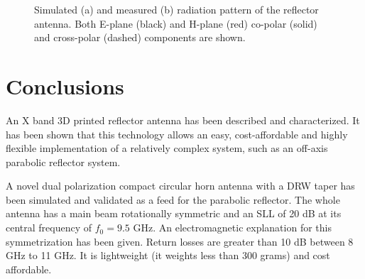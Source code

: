 \documentclass{IEEEtran}
\begin{document}
\begin{figure}[h]
	\centering
	\mbox{}
	\mbox{}
	\caption{Simulated (a) and measured (b) radiation pattern of the reflector antenna. Both E-plane (black) and H-plane (red) co-polar (solid) and cross-polar (dashed) components are shown.}
	\label{fig:DR}
\end{figure}

\section{Conclusions}

An X band 3D printed reflector antenna has been described and characterized. It has been shown that this technology allows an easy, cost-affordable and highly flexible implementation of a relatively complex system, such as an off-axis parabolic reflector system. 

A novel dual polarization compact circular horn antenna with a DRW taper has been simulated and validated as a feed for the parabolic reflector. The whole antenna has a main beam rotationally symmetric and an SLL of 20 dB at its central frequency of $f_0=9.5$ GHz. An electromagnetic explanation  for this symmetrization has been given. Return losses are greater than 10 dB between 8 GHz to 11 GHz. It is lightweight (it weights less than 300 grams) and cost affordable.
\end{document}
